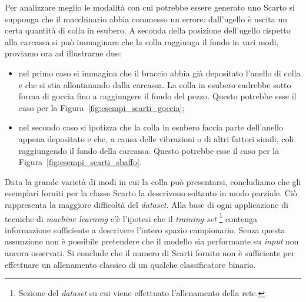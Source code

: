 Per analizzare meglio le modalità con cui potrebbe essere generato uno Scarto si supponga che il macchinario abbia commesso un errore: dall'ugello è uscita un certa quantità di colla in esubero.
A seconda della posizione dell'ugello rispetto alla carcassa si può immaginare che la colla raggiunga il fondo in vari modi, proviamo ora ad illustrarne due:
\begin{itemize}
  \item nel primo caso si immagina che il braccio abbia già depositato l'anello di colla e che si stia allontanando dalla carcassa.
    La colla in esubero cadrebbe sotto forma di goccia fino a raggiungere il fondo del pezzo.
    Questo potrebbe esse il caso per la Figura~\ref{fig:esempi_scarti_goccia};
  \item nel secondo caso si ipotizza che la colla in esubero faccia parte dell'anello appena depositato e che, a causa delle vibrazioni o di altri fattori simili, coli raggiungendo il fondo della carcassa.
    Questo potrebbe esse il caso per la Figura~\ref{fig:esempi_scarti_sbaffo}.
\end{itemize}

Data la grande varietà di modi in cui la colla può presentarsi, concludiamo che gli esemplari forniti per la classe Scarto la descrivono soltanto in modo parziale.
Ciò rappresenta la maggiore difficoltà del \textit{dataset}.
Alla base di ogni applicazione di tecniche di \textit{machine learning} c'è l'ipotesi che il \textit{training set} \footnote{Sezione del \textit{dataset} su cui viene effettuato l'allenamento della rete.} contenga informazione sufficiente a descrivere l'intero spazio campionario.
Senza questa assunzione non è possibile pretendere che il modello sia performante su \textit{input} non ancora osservati.
Si conclude che il numero di Scarti fornito non è sufficiente per effettuare un allenamento classico di un qualche classificatore binario.

